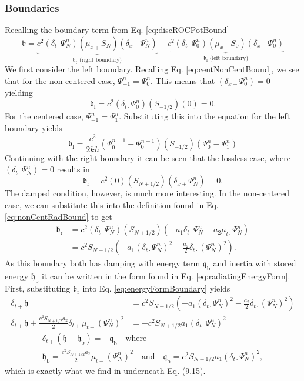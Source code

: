 \documentclass[dvipsnames]{article}
\def\dxp{\delta_{x+}}
\def\dxm{\delta_{x-}}
\def\mup{\mu_{x+}}
\def\mum{\mu_{x-}}
\def\dtd{\delta_{t\cdot}}
\begin{document}
\subsubsection{Boundaries}\label{sec:boundaries}
Recalling the boundary term from Eq. \eqref{eq:discROCPotBound} 
\begin{equation}
    \mathfrak{b} = \underbrace{ c^2(\dtd\Psi_N^n)(\mup S_N)(\dxp\Psi_N^n)}_{\mathfrak{b_\text{r}} \text{ (right boundary)}} -\underbrace{c^2(\dtd\Psi_0^n)(\mum S_0)(\dxm \Psi_0^n)}_{\mathfrak{b}_\text{l} \text{ (left boundary)}}
\end{equation}
We first consider the left boundary. Recalling Eq. \eqref{eq:centNonCentBound}, we see that for the non-centered case, $\Psi_{-1}^n = \Psi_0^n$. This means that $(\dxm\Psi_0^n) = 0 $ yielding
\begin{equation}
    \mathfrak{b}_\text{l} = c^2(\dtd\Psi_0^n)(S_{-1/2})(0) = 0.
\end{equation}
For the centered case, $\Psi_{-1}^n = \Psi_1^n$. Substituting this into the equation for the left boundary yields
\begin{equation}
    \mathfrak{b}_\text{l} = \frac{c^2}{2kh}(\Psi_0^{n+1} - \Psi_0^{n-1})(S_{-1/2})(\Psi_0^n - \Psi_1^n)
\end{equation}
Continuing with the right boundary it can be seen that the lossless case, where $(\dtd \Psi_N^n) = 0$ results in 
\begin{equation}
    \mathfrak{b}_\text{r} = c^2(0)(S_{N+1/2})(\dxp\Psi_N^n) = 0.
\end{equation}
The damped condition, however, is much more interesting. In the non-centered case, we can substitute this into the definition found in Eq. \eqref{eq:nonCentRadBound} to get
\begin{align}
    \mathfrak{b}_\text{r} &= c^2(\dtd\Psi_N^n)( S_{N+1/2})(-a_1\dtd\Psi_N^n - a_2\mu_{t\cdot}\Psi_N^n)\nonumber\\
    &= c^2 S_{N+1/2}\left(-a_1(\dtd\Psi_N^n)^2 - \frac{a_2}{2}\dtd(\Psi_N^n)^2\right).
\end{align}
As this boundary both has damping with energy term $\mathfrak{q}_\text{b}$ and inertia with stored energy $\mathfrak{h}_\text{b}$ it can be written in the form found in Eq. \eqref{eq:radiatingEnergyForm}. First, substituting $\mathfrak{b}_\text{r}$ into Eq. \eqref{eq:energyFormBoundary} yields %
\begin{align}
\delta_{t+}\mathfrak{h} &= c^2 S_{N+1/2}\left(-a_1(\dtd\Psi_N^n)^2 - \frac{a_2}{2}\dtd(\Psi_N^n)^2\right)\\
\delta_{t+}\mathfrak{h} + \frac{c^2S_{N+1/2}a_2}{2}\delta_{t+}\mu_{t-} (\Psi_N^n)^2 &= -c^2S_{N+1/2}a_1(\dtd\Psi_N^n)^2
\end{align}
%
\begin{gather}
\delta_{t+}\left(\mathfrak{h} + \mathfrak{h}_\text{b}\right) = -\mathfrak{q}_\text{b} \quad \text{where}\\
\mathfrak{h}_\text{b} = \frac{c^2S_{N+1/2}a_2}{2}\mu_{t-} (\Psi_N^n)^2 \quad \text{and} \quad
\mathfrak{q}_\text{b} = c^2S_{N+1/2}a_1(\dtd\Psi_N^n)^2,
\end{gather}
which is exactly what we find in \cite{Bilbao2009} underneath Eq. (9.15).
\end{document}
